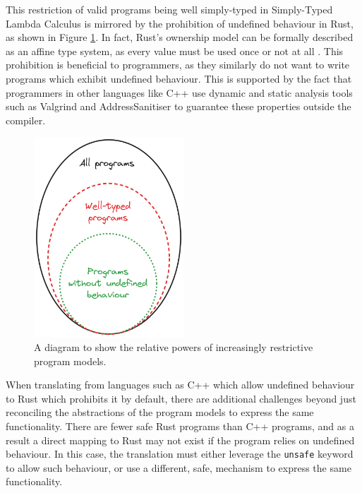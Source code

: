 This restriction of valid programs being well simply-typed in Simply-Typed Lambda Calculus is mirrored by the prohibition of undefined behaviour in Rust, as shown in Figure \ref{fig:excalidraw_programs_venn}. In fact, Rust's ownership model can be formally described as an affine type system, as every value must be used once or not at all \cite{reed2015patina}. This prohibition is beneficial to programmers, as they similarly do not want to write programs which exhibit undefined behaviour. This is supported by the fact that programmers in other languages like C++ use dynamic and static analysis tools such as Valgrind \cite{ValgrindHome} and AddressSanitiser \cite{Sanitizers2023} to guarantee these properties outside the compiler.

\begin{figure}[H]
    \centering
    \includegraphics[width=0.5\textwidth]{images/3_translation/excalidraw_programs_venn.png}
    \caption{A diagram to show the relative powers of increasingly restrictive program models.}
    \label{fig:excalidraw_programs_venn}
\end{figure}

When translating from languages such as C++ which allow undefined behaviour to Rust which prohibits it by default, there are additional challenges beyond just reconciling the abstractions of the program models to express the same functionality. There are fewer safe Rust programs than C++ programs, and as a result a direct mapping to Rust may not exist if the program relies on undefined behaviour. In this case, the translation must either leverage the \texttt{unsafe} keyword to allow such behaviour, or use a different, safe, mechanism to express the same functionality.


